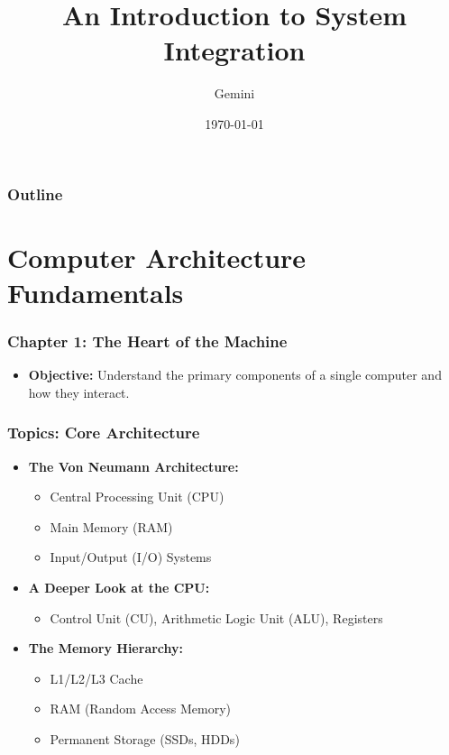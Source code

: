 \documentclass{beamer}
\title{An Introduction to System Integration}
\author{Gemini}
\institute{Software Team}
\date{\today}
\begin{document}
\begin{frame}
  \titlepage
\end{frame}

\begin{frame}
  \frametitle{Outline}
  \tableofcontents
\end{frame}

\section{Computer Architecture Fundamentals}

\begin{frame}
  \frametitle{Chapter 1: The Heart of the Machine}
  \begin{itemize}
    \item \textbf{Objective:} Understand the primary components of a single computer and how they interact.
  \end{itemize}
\end{frame}

\begin{frame}[fragile]
  \frametitle{Topics: Core Architecture}
  \begin{itemize}
    \item \textbf{The Von Neumann Architecture:}
    \begin{itemize}
        \item Central Processing Unit (CPU)
        \item Main Memory (RAM)
        \item Input/Output (I/O) Systems
    \end{itemize}
    \item \textbf{A Deeper Look at the CPU:}
    \begin{itemize}
        \item Control Unit (CU), Arithmetic Logic Unit (ALU), Registers
    \end{itemize}
    \item \textbf{The Memory Hierarchy:}
    \begin{itemize}
        \item L1/L2/L3 Cache
        \item RAM (Random Access Memory)
        \item Permanent Storage (SSDs, HDDs)
    \end{itemize}
  \end{itemize}
\end{frame}
\end{document}
